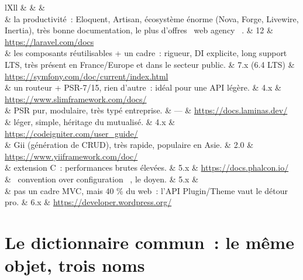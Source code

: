 \begin{tabz}{lXll}
  \headrow {} \&  \&  \&  \\
  \midrule
   \& la productivit\'e~: Eloquent, Artisan, \'ecosyst\`eme \'enorme (Nova, Forge, Livewire, Inertia), tr\`es bonne documentation, le plus d'offres \og ~web agency~ \fg{}. \& 12 \& \url{https://laravel.com/docs} \\
   \& les composants r\'eutilisables + un cadre~: rigueur, DI explicite, long support LTS, tr\`es pr\'esent en France/Europe et dans le secteur public. \& 7.x (6.4 LTS) \& \url{https://symfony.com/doc/current/index.html} \\
   \& un routeur + PSR-7/15, rien d'autre~: id\'eal pour une API l\'eg\`ere. \& 4.x \& \url{https://www.slimframework.com/docs/} \\
   \& PSR pur, modulaire, tr\`es typ\'e entreprise. \& --- \& \url{https://docs.laminas.dev/} \\
   \& l\'eger, simple, h\'eritage du mutualis\'e. \& 4.x \& \url{https://codeigniter.com/user_guide/} \\
   \& Gii (g\'en\'eration de CRUD), tr\`es rapide, populaire en Asie. \& 2.0 \& \url{https://www.yiiframework.com/doc/} \\
   \& extension C~: performances brutes \'elev\'ees. \& 5.x \& \url{https://docs.phalcon.io/} \\
   \& \og ~convention over configuration~ \fg{}, le doyen. \& 5.x \& \\
   \& pas un cadre MVC, mais 40 \% du web~: l'API Plugin/Theme vaut le d\'etour pro. \& 6.x \& \url{https://developer.wordpress.org/} \\
\end{tabz}

\section{Le dictionnaire commun~: le m\^eme objet, trois noms}

